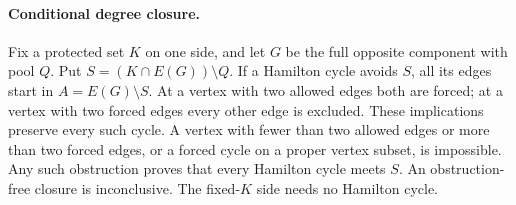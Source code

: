 \paragraph{Conditional degree closure.}
Fix a protected set $K$ on one side, and let $G$ be the full opposite
component with pool $Q$. Put $S=(K\cap E(G))\setminus Q$.
If a Hamilton cycle avoids $S$, all its edges start in
$A=E(G)\setminus S$. At a vertex with two allowed edges both are forced;
at a vertex with two forced edges every other edge is excluded.
These implications preserve every such cycle. A vertex with fewer than
two allowed edges or more than two forced edges, or a forced cycle on a
proper vertex subset, is impossible. Any such obstruction proves that
every Hamilton cycle meets $S$. An obstruction-free closure is inconclusive.
The fixed-$K$ side needs no Hamilton cycle.
